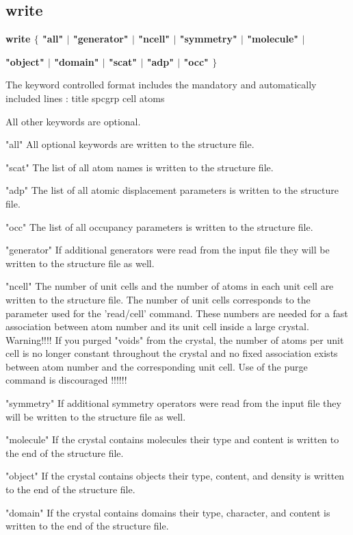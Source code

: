 \subsection*{write}
{\bf write $ \{$ "all" $| $ "generator" $| $ "ncell" $| $ "symmetry" $| $ "molecule" $| $ \par }
{\bf         "object" $| $ "domain" $| $ "scat" $| $ "adp" $| $ "occ" $\} $ \par }
\par
\vspace{3pt}
The keyword controlled format includes the mandatory  and 
automatically included lines : 
title 
spcgrp 
cell 
atoms 
\par
All other keywords are optional. 
\par
"all"        All optional keywords are written to the structure 
             file. 
\par
"scat"       The list of all atom names is written to the structure 
             file. 
\par
"adp"        The list of all atomic displacement parameters is written 
             to the structure file. 
\par
"occ"        The list of all occupancy parameters is written 
             to the structure file. 
\par
"generator"  If additional generators were read from the input file 
             they will be written to the structure file as well. 
\par
"ncell"      The number of unit cells and the number of atoms in each 
             unit cell are written to the structure file. The number 
             of unit cells corresponds to the parameter used for the 
             'read/cell' command. These numbers are needed for a fast 
             association between atom number and its unit cell inside 
             a large crystal. 
             Warning!!!! If you purged "voids" from the crystal, the 
             number of atoms per unit cell is no longer constant 
             throughout the crystal and no fixed association exists 
             between atom number and the corresponding unit cell. 
             Use of the purge command is discouraged !!!!!! 
\par
"symmetry"   If additional symmetry operators were read from the input file 
             they will be written to the structure file as well. 
\par
"molecule"   If the crystal contains molecules their type and content 
             is written to the end of the structure file. 
\par
"object"     If the crystal contains objects their type, content, 
             and density is written to the end of the structure file. 
\par
"domain"     If the crystal contains domains their type, character, 
             and content is written to the end of the structure file. 
